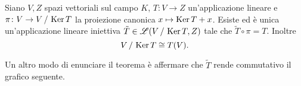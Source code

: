 \begin{teorema} \label{t:isomorfismo-1}
	Siano $V,Z$ spazi vettoriali sul campo $K$, $T\colon V\to Z$ un'applicazione lineare e $\pi\colon V\to V\,/\,\operatorname{Ker} T$ la proiezione canonica $x\mapsto\operatorname{Ker} T+x$.
	Esiste ed è unica un'applicazione lineare iniettiva $\tilde{T}\in\mathscr L(V\,/\,\operatorname{Ker} T,Z)$ tale che $\tilde{T}\circ\pi=T$.
	Inoltre
	\begin{equation}
		V\,/\,\operatorname{Ker} T\cong T(V).
		\label{eq:isomorfismo-1}
	\end{equation}
\end{teorema}
Un altro modo di enunciare il teorema è affermare che $\tilde{T}$ rende commutativo il grafico seguente.

\centerline{}

